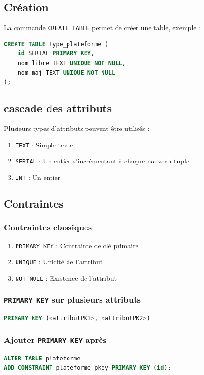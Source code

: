 \subsection{Création}
La commande \texttt{CREATE TABLE} permet de créer une table, exemple :
\begin{lstlisting}[language=SQL]
CREATE TABLE type_plateforme (
    id SERIAL PRIMARY KEY,
    nom_libre TEXT UNIQUE NOT NULL,
    nom_maj TEXT UNIQUE NOT NULL
);
\end{lstlisting}

\subsection{cascade des attributs}
Plusieurs types d'attributs peuvent être utilisés :
\begin{enumerate}
    \item \texttt{TEXT} : Simple texte
    \item \texttt{SERIAL} : Un entier s'incrémentant à chaque nouveau tuple
    \item \texttt{INT} : Un entier
\end{enumerate}

\subsection{Contraintes}
\subsubsection{Contraintes classiques}
\begin{enumerate}
    \item \texttt{PRIMARY KEY} : Contrainte de clé primaire
    \item \texttt{UNIQUE} : Unicité de l'attribut
    \item \texttt{NOT NULL} : Existence de l'attribut
\end{enumerate}

\subsubsection{\texttt{PRIMARY KEY} sur plusieurs attributs}
\begin{lstlisting}[language=SQL]
PRIMARY KEY (<attributPK1>, <attributPK2>)
\end{lstlisting}

\subsubsection{Ajouter \texttt{PRIMARY KEY} après}
\begin{lstlisting}[language=SQL]
ALTER TABLE plateforme
ADD CONSTRAINT plateforme_pkey PRIMARY KEY (id);
\end{lstlisting}

